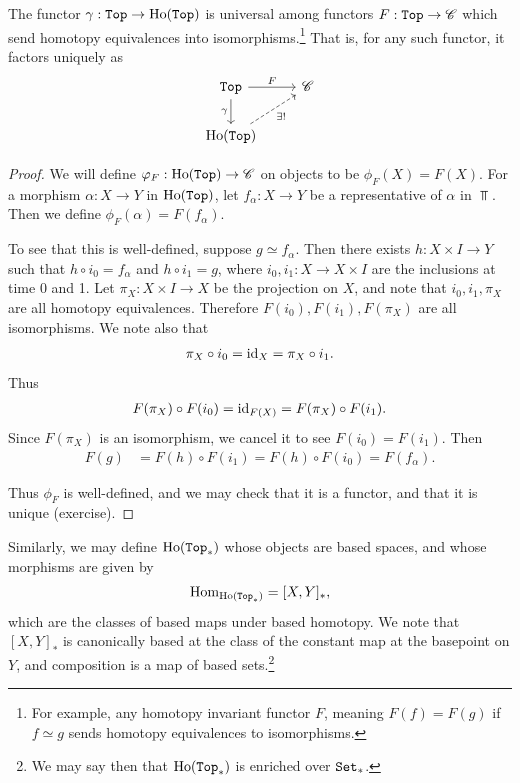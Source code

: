 \documentclass{article}[11pt]
\begin{document}
\begin{proposition} The functor $\gamma : \texttt{Top} \to \text{Ho}(\texttt{Top})$ is universal among functors $F: \texttt{Top} \to \mathscr{C}$ which send homotopy equivalences into isomorphisms.\footnote{For example, any homotopy invariant functor $F$, meaning $F(f) = F(g)$ if $f\simeq g$ sends homotopy equivalences to isomorphisms. }
That is, for any such functor, it factors uniquely as
\[
	\begin{tikzcd}
	\Top\dar["\gamma" left]\rar["F" above] & \C \\
	\Ho(\Top)\ar[ur,dashed,"\exists!" below right] &
	\end{tikzcd}
\]
\end{proposition}
\begin{proof} We will define $\varphi_F : \text{Ho}(\texttt{Top}) \to \mathscr{C}$ on objects to be $\phi_F(X) = F(X)$. For a morphism $\alpha : X \to Y$ in $\text{Ho}(\texttt{Top})$, let $f_\alpha : X\to Y$ be a representative of $\alpha$ in $\Top$. Then we define $\phi_F (\alpha) = F(f_\alpha)$.

To see that this is well-defined, suppose $g\simeq f_\alpha$. Then there exists $h\colon X\times I \to Y$ such that $h \circ i_0 = f_\alpha$ and $h \circ i_1 = g$, where $i_0,i_1 \colon X \to X\times I$ are the inclusions at time 0 and 1. Let $\pi_X \colon X\times I \to X$ be the projection on $X$, and note that $i_0, i_1, \pi_X$ are all homotopy equivalences. Therefore $F(i_0), F(i_1), F(\pi_X)$ are all isomorphisms. We note also that
\begin{align*}
	\pi_X \circ i_0 = \text{id}_X = \pi_X \circ i_1.
\end{align*}
Thus
\begin{align*}
	F(\pi_X) \circ F(i_0) = \text{id}_{F(X)} = F(\pi_X) \circ F(i_1).
\end{align*}
Since $F(\pi_X)$ is an isomorphism, we cancel it to see $F(i_0) = F(i_1)$. Then
\begin{align*}
	F(g) &= F(h) \circ F(i_1) = F(h)\circ F(i_0) = F(f_\alpha).
\end{align*}

Thus $\phi_F$ is well-defined, and we may check that it is a functor, and that it is unique (exercise).
\end{proof}

Similarly, we may define $\text{Ho}(\texttt{Top}_\ast)$ whose objects are based spaces, and whose morphisms are given by
\begin{align*}
	\textup{Hom}_{\text{Ho}(\texttt{Top}_\ast)} = [X,Y]_\ast,
\end{align*}
which are the classes of based maps under based homotopy. We note that $[X,Y]_\ast$ is canonically based at the class of the constant map at the basepoint on $Y$, and composition is a map of based sets.\footnote{We may say then that $\text{Ho}(\texttt{Top}_\ast)$ is enriched over $\texttt{Set}_\ast$.}
\end{document}
